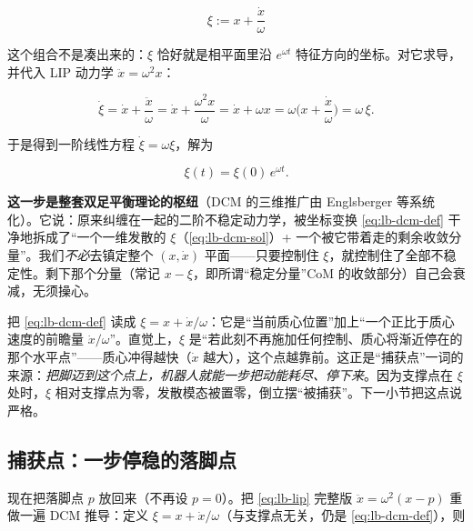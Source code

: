 \begin{equation}
  \boxed{\;\xi := x+\frac{\dot x}{\omega}\;}
  \label{eq:lb-dcm-def}
\end{equation}

这个组合不是凑出来的：$\xi$ 恰好就是相平面里沿 $e^{\omega t}$ 特征方向的坐标。对它求导，并代入 LIP 动力学 $\ddot x=\omega^2 x$：

\begin{equation}
  \dot\xi=\dot x+\frac{\ddot x}{\omega}
  =\dot x+\frac{\omega^2 x}{\omega}
  =\dot x+\omega x
  =\omega\Big(x+\frac{\dot x}{\omega}\Big)
  =\omega\,\xi.
  \label{eq:lb-dcm-dyn}
\end{equation}

于是得到一阶线性方程 $\dot\xi=\omega\xi$，解为

\begin{equation}
  \xi(t)=\xi(0)\,e^{\omega t}.
  \label{eq:lb-dcm-sol}
\end{equation}

\textbf{这一步是整套双足平衡理论的枢纽}（DCM 的三维推广由 Englsberger 等系统化\cite{englsberger2015dcm}）。它说：原来纠缠在一起的二阶不稳定动力学，被坐标变换 \cref{eq:lb-dcm-def} 干净地拆成了“一个一维发散的 $\xi$（\cref{eq:lb-dcm-sol}）+ 一个被它带着走的剩余收敛分量”。我们\emph{不必}去镇定整个 $(x,\dot x)$ 平面——只要控制住 $\xi$，就控制住了全部不稳定性。剩下那个分量（常记 $x-\xi$，即所谓“稳定分量”CoM 的收敛部分）自己会衰减，无须操心。

\begin{note}\label{note:lb-dcm-name}
把 \cref{eq:lb-dcm-def} 读成 $\xi=x+\dot x/\omega$：它是“当前质心位置”加上“一个正比于质心速度的前瞻量 $\dot x/\omega$”。直觉上，$\xi$ 是“若此刻不再施加任何控制、质心将渐近停在的那个水平点”——质心冲得越快（$\dot x$ 越大），这个点越靠前。这正是“捕获点”一词的来源：\emph{把脚迈到这个点上，机器人就能一步把动能耗尽、停下来}。因为支撑点在 $\xi$ 处时，$\xi$ 相对支撑点为零，发散模态被置零，倒立摆“被捕获”。下一小节把这点说严格。
\end{note}

\subsection{捕获点：一步停稳的落脚点}
\label{subsec:lb-capture}

现在把落脚点 $p$ 放回来（不再设 $p=0$）。把 \cref{eq:lb-lip} 完整版 $\ddot x=\omega^2(x-p)$ 重做一遍 DCM 推导：定义 $\xi=x+\dot x/\omega$（与支撑点无关，仍是 \cref{eq:lb-dcm-def}），则

